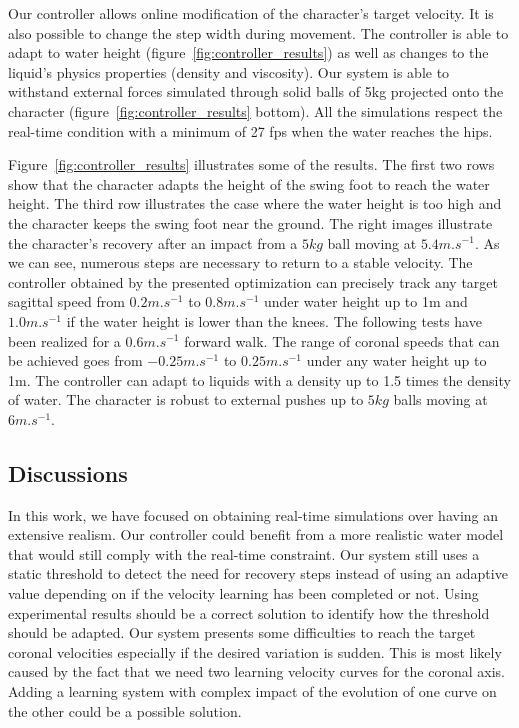 \documentclass[runningheads,a4paper,10pt]{llncs}
\begin{document}
Our controller allows online modification of the character's target velocity. It is also possible to change the step width during movement. The controller is able to adapt to water height (figure~\ref{fig:controller_results}) as well as changes to the liquid's physics properties (density and viscosity). Our system is able to withstand external forces simulated through solid balls of 5kg projected onto the character (figure~\ref{fig:controller_results} bottom). All the simulations respect the real-time condition with a minimum of 27 fps when the water reaches the hips.

Figure~\ref{fig:controller_results} illustrates some of the results. The first two rows show that the character adapts the height of the swing foot to reach the water height. The third row illustrates the case where the water height is too high and the character keeps the swing foot near the ground. The right images illustrate the character's recovery after an impact from a $5kg$ ball moving at $5.4m.s^{-1}$. As we can see, numerous steps are necessary to return to a stable velocity.
The controller obtained by the presented optimization can precisely track any target sagittal speed from $0.2m.s^{-1}$ to $0.8m.s^{-1}$ under water height up to 1m and $1.0m.s^{-1}$ if the water height is lower than the knees. The following tests have been realized for a $0.6m.s^{-1}$ forward walk. The range of coronal speeds that can be achieved goes from $-0.25m.s^{-1}$ to $0.25m.s^{-1}$ under any water height up to 1m. The controller can adapt to liquids with a density up to 1.5 times the density of water. The character is robust to external pushes up to $5kg$ balls moving at $6m.s^{-1}$.
\subsection{Discussions}

In this work, we have focused on obtaining real-time simulations over having an extensive realism. Our controller could benefit from a more realistic water model that would still comply with the real-time constraint.
Our system still uses a static threshold to detect the need for recovery steps instead of using an adaptive value depending on if the velocity learning has been completed or not. Using experimental results should be a correct solution to identify how the threshold should be adapted.
Our system presents some difficulties to reach the target coronal velocities especially if the desired variation is sudden. This is most likely caused by the fact that we need two learning velocity curves for the coronal axis. Adding a learning system with complex impact of the evolution of one curve on the other could be a possible solution.
\vspace{-2mm} %
\end{document}
